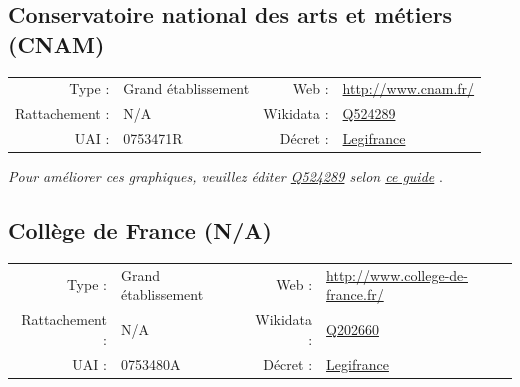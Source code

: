 \documentclass[11pt,french,landscape]{article}
\begin{document}
\newpage

\hypertarget{conservatoire-national-des-arts-et-muxe9tiers-cnam}{%
\subsection{Conservatoire national des arts et métiers
(CNAM)}\label{conservatoire-national-des-arts-et-muxe9tiers-cnam}}

\begin{tabular*}{0.45\textwidth}{rp{2cm}rl}  
\hline  
Type : & Grand établissement & Web : &\href{http://www.cnam.fr/}{http://www.cnam.fr/} \\  
Rattachement : & N/A & Wikidata : & \href{https://www.wikidata.org/entity/Q524289}{Q524289} \\  
UAI : & 0753471R & Décret : & \href{http://www.legifrance.gouv.fr/affichTexte.do?dateTexte=&categorieLien=id&cidTexte=JORFTEXT000021292171&fastPos=1&fastReqId=2018633024&oldAction=rechExpTexteJorf}{Legifrance} \\  
\hline  
\end{tabular*}

\textit{\scriptsize Pour améliorer ces graphiques, veuillez éditer \href{https://www.wikidata.org/entity/Q524289}{Q524289}  selon \href{https://github.com/cpesr/wikidataESR/blob/master/Rmd/wikidataESR.md}{ce guide}}
.


\newpage

\hypertarget{colluxe8ge-de-france-na}{%
\subsection{Collège de France (N/A)}\label{colluxe8ge-de-france-na}}

\begin{tabular*}{0.45\textwidth}{rp{2cm}rl}  
\hline  
Type : & Grand établissement & Web : &\href{http://www.college-de-france.fr/}{http://www.college-de-france.fr/} \\  
Rattachement : & N/A & Wikidata : & \href{https://www.wikidata.org/entity/Q202660}{Q202660} \\  
UAI : & 0753480A & Décret : & \href{http://www.legifrance.gouv.fr/affichTexte.do?dateTexte=&categorieLien=id&cidTexte=JORFTEXT000000350825&fastPos=2&fastReqId=1763095596&oldAction=rechExpTexteJorf}{Legifrance} \\  
\hline  
\end{tabular*}
\end{document}

